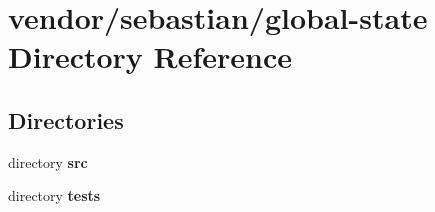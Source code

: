 \section{vendor/sebastian/global-\/state Directory Reference}
\label{dir_d85c77400dbfe0246cd41dd6a6536d5a}
\subsection*{Directories}
\begin{DoxyCompactItemize}
\item 
directory {\bf src}
\item 
directory {\bf tests}
\end{DoxyCompactItemize}
